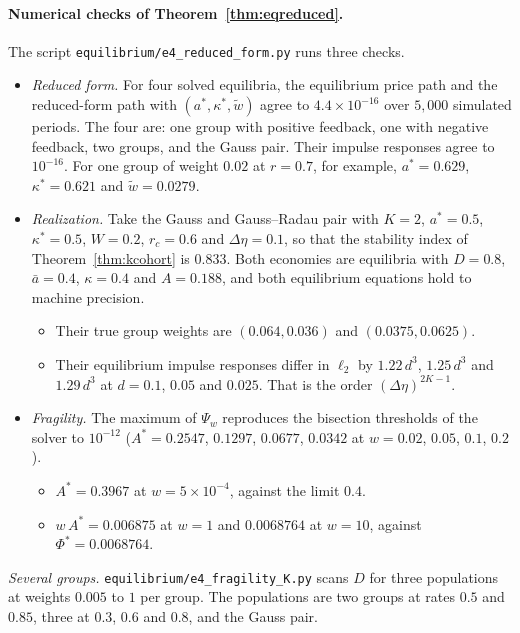 \documentclass[12pt]{article}
\theoremstyle{definition}
\theoremstyle{remark}
\begin{document}
\paragraph{Numerical checks of Theorem~\ref{thm:eqreduced}.} The script \nolinkurl{equilibrium/e4_reduced_form.py} runs three checks.
\begin{itemize}[itemsep=1pt,topsep=2pt]
\item \emph{Reduced form.} For four solved equilibria, the equilibrium price path and the reduced-form path with $(a^*,\kappa^*,\tilde w)$ agree to $4.4\times10^{-16}$ over $5{,}000$ simulated periods. The four are: one group with positive feedback, one with negative feedback, two groups, and the Gauss pair. Their impulse responses agree to $10^{-16}$. For one group of weight $0.02$ at $r=0.7$, for example, $a^*=0.629$, $\kappa^*=0.621$ and $\tilde w=0.0279$.
\item \emph{Realization.} Take the Gauss and Gauss--Radau pair with $K=2$, $a^*=0.5$, $\kappa^*=0.5$, $W=0.2$, $r_c=0.6$ and $\Delta\eta=0.1$, so that the stability index of Theorem~\ref{thm:kcohort} is $0.833$. Both economies are equilibria with $D=0.8$, $\bar a=0.4$, $\kappa=0.4$ and $A=0.188$, and both equilibrium equations hold to machine precision.
 \begin{itemize}[itemsep=1pt,topsep=2pt]
 \item Their true group weights are $(0.064,0.036)$ and $(0.0375,0.0625)$.
 \item Their equilibrium impulse responses differ in $\ell_2$ by $1.22\,d^3$, $1.25\,d^3$ and $1.29\,d^3$ at $d=0.1$, $0.05$ and $0.025$. That is the order $(\Delta\eta)^{2K-1}$.
 \end{itemize}
\item \emph{Fragility.} The maximum of $\Psi_w$ reproduces the bisection thresholds of the solver to $10^{-12}$ ($A^*=0.2547$, $0.1297$, $0.0677$, $0.0342$ at $w=0.02$, $0.05$, $0.1$, $0.2$).
 \begin{itemize}[itemsep=1pt,topsep=2pt]
 \item $A^*=0.3967$ at $w=5\times10^{-4}$, against the limit $0.4$.
 \item $w\,A^*=0.006875$ at $w=1$ and $0.0068764$ at $w=10$, against $\Phi^*=0.0068764$.
 \end{itemize}
\end{itemize}
\emph{Several groups.} \nolinkurl{equilibrium/e4_fragility_K.py} scans $D$ for three populations at weights $0.005$ to $1$ per group. The populations are two groups at rates $0.5$ and $0.85$, three at $0.3$, $0.6$ and $0.8$, and the Gauss pair.
\end{document}
